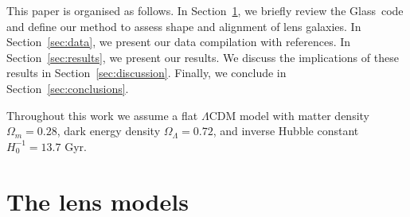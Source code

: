 \documentclass[useAMS,usenatbib]{mn2e}
\def\Glass{{\sc Glass}}
\begin{document}
This paper is organised as follows. In Section~\ref{sec:shapemethod}, we briefly review the \Glass\ code and define our method to assess shape and alignment of lens galaxies. In Section~\ref{sec:data}, we present our data compilation with references. In Section~\ref{sec:results}, we present our results. We discuss the implications of these results in Section~\ref{sec:discussion}. Finally, we conclude in Section~\ref{sec:conclusions}.

Throughout this work we assume a flat $\Lambda$CDM model with matter density $\Omega_{m} = 0.28$, dark energy density $\Omega_{\Lambda} = 0.72$, and inverse Hubble constant $H_{0}^{-1} = 13.7$ Gyr.


\section{The lens models}\label{sec:shapemethod}
\setlength\tabcolsep{7pt}
\end{document}
